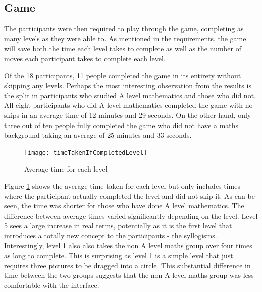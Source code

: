 \documentclass[12pt,a4paper]{report}
\begin{document}
\subsection{Game}

The participants were then required to play through the game, completing as many levels as they were able to. As mentioned in the requirements, the game will save both the time each level takes to complete as well as the number of moves each participant takes to complete each level. 

Of the 18 participants, 11 people completed the game in its entirety without skipping any levels. Perhaps the most interesting observation from the results is the split in participants who studied A level mathematics and those who did not. All eight participants who did A level mathematics completed the game with no skips in an average time of 12 minutes and 29 seconds. On the other hand, only three out of ten people fully completed the game who did not have a maths background taking an average of 25 minutes and 33 seconds.


\begin{figure}[h]
\centering
    \texttt{[image: timeTakenIfCompletedLevel]}
    \caption{Average time for each level}
        \label{fig:timeTakenIfCompletedLevel}
\end{figure}
\FloatBarrier

Figure \ref{fig:timeTakenIfCompletedLevel} shows the average time taken for each level but only includes times where the participant actually completed the level and did not skip it. As can be seen, the time was shorter for those who have done A level mathematics. The difference between average times varied significantly depending on the level. Level 5 sees a large increase in real terms, potentially as it is the first level that introduces a totally new concept to the participants - the syllogisms. Interestingly, level 1 also also takes the non A level maths group over four times as long to complete. This is surprising as level 1 is a simple level that just requires three pictures to be dragged into a circle. This substantial difference in time between the two groups suggests that the non A level maths group was less comfortable with the interface.
\end{document}
